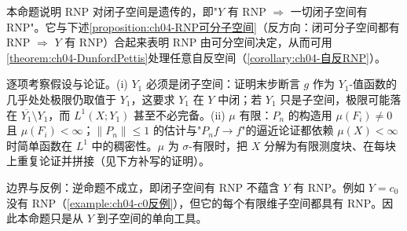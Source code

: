 \documentclass[../../main.tex]{subfiles}%
\begin{document}
\begin{remark}\label{remark:ch04-RNP子空间}
本命题说明 RNP 对闭子空间是遗传的，即"$Y$ 有 RNP $\Rightarrow$ 一切闭子空间有 RNP"。它与下述\cref{proposition:ch04-RNP可分子空间}（反方向：闭可分子空间都有 RNP $\Rightarrow$ $Y$ 有 RNP）合起来表明 RNP 由可分空间决定，从而可用\cref{theorem:ch04-DunfordPettis}处理任意自反空间（\cref{corollary:ch04-自反RNP}）。

逐项考察假设与论证。(i) $Y_1$ 必须是闭子空间：证明末步断言 $g$ 作为 $Y_1$-值函数的几乎处处极限仍取值于 $Y_1$，这要求 $Y_1$ 在 $Y$ 中闭；若 $Y_1$ 只是子空间，极限可能落在 $\overline{Y_1}\setminus Y_1$，而 $L^1(X;Y_1)$ 甚至不必完备。(ii) $\mu$ 有限：$P_n$ 的构造用 $\mu(F_i)\neq0$ 且 $\mu(F_i)<\infty$；$\|P_n\|\leqslant1$ 的估计与"$P_nf\to f$"的逼近论证都依赖 $\mu(X)<\infty$ 时简单函数在 $L^1$ 中的稠密性。$\mu$ 为 $\sigma$-有限时，把 $X$ 分解为有限测度块、在每块上重复论证并拼接（见下方补写的证明）。

边界与反例：逆命题不成立，即闭子空间有 RNP 不蕴含 $Y$ 有 RNP。例如 $Y=c_0$ 没有 RNP（\cref{example:ch04-c0反例}），但它的每个有限维子空间都具有 RNP。因此本命题只是从 $Y$ 到子空间的单向工具。
\end{remark}
\end{document}
